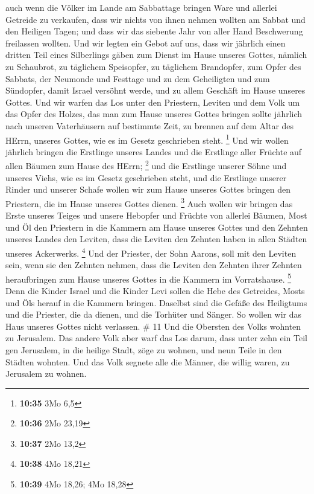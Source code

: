  auch wenn die Völker im Lande am Sabbattage bringen Ware
und allerlei Getreide zu verkaufen, dass wir nichts von ihnen nehmen
wollten am Sabbat und den Heiligen Tagen; und dass wir das siebente Jahr
von aller Hand Beschwerung freilassen wollten.  Und wir
legten ein Gebot auf uns, dass wir jährlich einen dritten Teil eines
Silberlings gäben zum Dienst im Hause unseres Gottes, 
nämlich zu Schaubrot, zu täglichem Speisopfer, zu täglichem Brandopfer,
zum Opfer des Sabbats, der Neumonde und Festtage und zu dem Geheiligten
und zum Sündopfer, damit Israel versöhnt werde, und zu allem Geschäft im
Hause unseres Gottes.  Und wir warfen das Los unter den
Priestern, Leviten und dem Volk um das Opfer des Holzes, das man zum
Hause unseres Gottes bringen sollte jährlich nach unseren Vaterhäusern
auf bestimmte Zeit, zu brennen auf dem Altar des HErrn, unseres Gottes,
wie es im Gesetz geschrieben steht. \footnote{\textbf{10:35} 3Mo 6,5}
 Und wir wollen jährlich bringen die Erstlinge unseres
Landes und die Erstlinge aller Früchte auf allen Bäumen zum Hause des
HErrn; \footnote{\textbf{10:36} 2Mo 23,19}  und die
Erstlinge unserer Söhne und unseres Viehs, wie es im Gesetz geschrieben
steht, und die Erstlinge unserer Rinder und unserer Schafe wollen wir
zum Hause unseres Gottes bringen den Priestern, die im Hause unseres
Gottes dienen. \footnote{\textbf{10:37} 2Mo 13,2}  Auch
wollen wir bringen das Erste unseres Teiges und unsere Hebopfer und
Früchte von allerlei Bäumen, Most und Öl den Priestern in die Kammern am
Hause unseres Gottes und den Zehnten unseres Landes den Leviten, dass
die Leviten den Zehnten haben in allen Städten unseres Ackerwerks.
\footnote{\textbf{10:38} 4Mo 18,21}  Und der Priester, der
Sohn Aarons, soll mit den Leviten sein, wenn sie den Zehnten nehmen,
dass die Leviten den Zehnten ihrer Zehnten heraufbringen zum Hause
unseres Gottes in die Kammern im Vorratshause. \footnote{\textbf{10:39}
  4Mo 18,26; 4Mo 18,28}  Denn die Kinder Israel und die
Kinder Levi sollen die Hebe des Getreides, Mosts und Öls herauf in die
Kammern bringen. Daselbst sind die Gefäße des Heiligtums und die
Priester, die da dienen, und die Torhüter und Sänger. So wollen wir das
Haus unseres Gottes nicht verlassen. \# 11  Und die Obersten
des Volks wohnten zu Jerusalem. Das andere Volk aber warf das Los darum,
dass unter zehn ein Teil gen Jerusalem, in die heilige Stadt, zöge zu
wohnen, und neun Teile in den Städten wohnten.  Und das Volk
segnete alle die Männer, die willig waren, zu Jerusalem zu wohnen.

